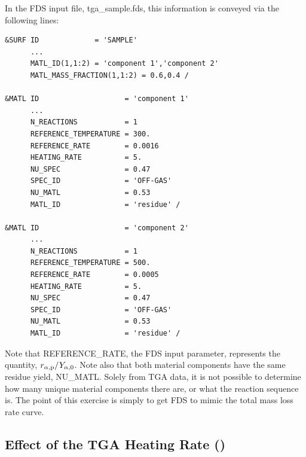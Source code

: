 \documentclass[11pt]{book}
\begin{document}
In the FDS input file, {\ct tga\_sample.fds}, this information is conveyed via the following lines:
\begin{lstlisting}
&SURF ID             = 'SAMPLE'
      ...
      MATL_ID(1,1:2) = 'component 1','component 2'
      MATL_MASS_FRACTION(1,1:2) = 0.6,0.4 /

&MATL ID                    = 'component 1'
      ...
      N_REACTIONS           = 1
      REFERENCE_TEMPERATURE = 300.
      REFERENCE_RATE        = 0.0016
      HEATING_RATE          = 5.
      NU_SPEC               = 0.47
      SPEC_ID               = 'OFF-GAS'
      NU_MATL               = 0.53
      MATL_ID               = 'residue' /

&MATL ID                    = 'component 2'
      ...
      N_REACTIONS           = 1
      REFERENCE_TEMPERATURE = 500.
      REFERENCE_RATE        = 0.0005
      HEATING_RATE          = 5.
      NU_SPEC               = 0.47
      SPEC_ID               = 'OFF-GAS'
      NU_MATL               = 0.53
      MATL_ID               = 'residue' /
\end{lstlisting}
Note that {\ct REFERENCE\_RATE}, the FDS input parameter, represents the quantity, $r_{\alpha,{\rm p}}/Y_{\alpha,0}$. Note also that both material components have the same residue yield, {\ct NU\_MATL}. Solely from TGA data, it is not possible to determine how many unique material components there are, or what the reaction sequence is. The point of this exercise is simply to get FDS to mimic the total mass loss rate curve.


\subsection{Effect of the TGA Heating Rate (\texorpdfstring{}{birch\_tga})}
\label{birch_tga}
\end{document}
